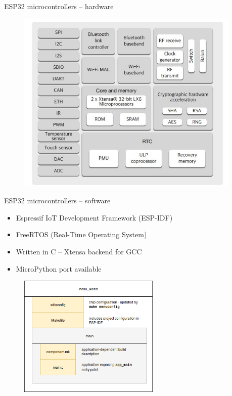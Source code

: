\documentclass[10pt]{beamer}
\begin{document}
\begin{frame}{ESP32 microcontrollers -- hardware}
\begin{figure}
\centering
\includegraphics[width=0.95\textwidth]{esp32_features.jpg}
\end{figure}
\end{frame}
\begin{frame}{ESP32 microcontrollers -- software}
\begin{itemize}
\item Espressif IoT Development Framework (ESP-IDF)
\item FreeRTOS (Real-Time Operating System)
\item Written in C -- Xtensa backend for GCC
\item MicroPython port available
\end{itemize}
\pause
\begin{figure}
\centering
\includegraphics[width=0.6\textwidth]{ESP-IDF.png}
\end{figure}
\end{frame}
\end{document}
